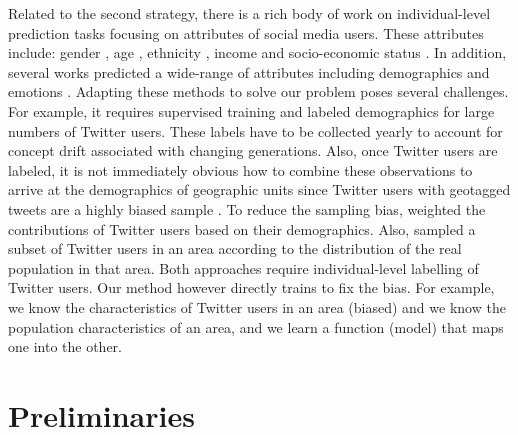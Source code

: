 \documentclass[letterpaper]{article}
\begin{document}
Related to the second strategy, there is a rich body of work on individual-level prediction tasks focusing on attributes of social media users. These attributes include: gender \cite{burger2011discriminating,bergsma2013broadly,bamman2014gender,vicente2015twitter}, age \cite{schwartz2013personality,moseley2014toward}, ethnicity \cite{chang2010epluribus,chen2015comparative}, income and socio-economic status \cite{preoctiuc2015studying,lampos2016inferring}. In addition, several works predicted a wide-range of attributes including demographics and emotions \cite{culotta2015predicting,volkova2015inferring}. Adapting these methods to solve our problem poses several challenges. For example, it requires supervised training and labeled demographics for large numbers of Twitter users. These labels have to be collected yearly to account for concept drift associated with changing generations. Also, once Twitter users are labeled, it is not immediately obvious how to combine these observations to arrive at the demographics of geographic units since Twitter users with geotagged tweets are a highly biased sample \cite{malik2015population}. To reduce the sampling bias, \citeauthor{culotta2014reducing}  weighted the contributions of Twitter users based on their demographics. Also, \citeauthor{almeida2015twitter}  sampled a subset of Twitter users in an area according to the distribution of the real population in that area. Both approaches require individual-level labelling of Twitter users. Our method however directly trains to fix the bias. For example, we know the characteristics of Twitter users in an area (biased) and we know the population characteristics of an area, and we learn a function (model) that maps one into the other.

\section{Preliminaries}
\end{document}
